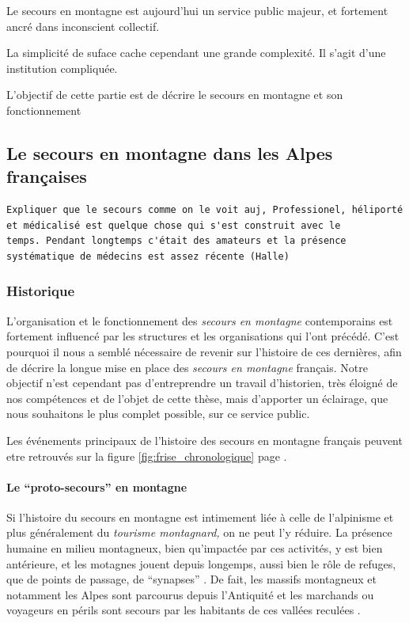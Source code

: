 Le secours en montagne est aujourd'hui un service public majeur, et
fortement ancré dans inconscient collectif.

La simplicité de suface cache cependant une grande complexité. Il
s'agit d'une institution compliquée.

L'objectif de cette partie est de décrire le secours en montagne et
son fonctionnement

\subsection{Le secours en montagne dans les Alpes françaises}
\label{subsec:1-1-1}


\begin{verbatim}
Expliquer que le secours comme on le voit auj, Professionel, héliporté
et médicalisé est quelque chose qui s'est construit avec le
temps. Pendant longtemps c'était des amateurs et la présence
systématique de médecins est assez récente (Halle)
\end{verbatim}

\subsubsection{Historique}
\label{subsubsec:1-1-1-1}

L'organisation et le fonctionnement des \emph{secours en montagne}
contemporains est fortement influencé par les structures et les
organisations qui l'ont précédé. C'est pourquoi il nous a semblé
nécessaire de revenir sur l'histoire de ces dernières, afin de décrire
la longue mise en place des \emph{secours en montagne} français. Notre
objectif n'est cependant pas d'entreprendre un travail d'historien,
très éloigné de nos compétences et de l'objet de cette thèse, mais
d'apporter un éclairage, que nous souhaitons le plus complet possible,
sur ce service public.

Les événements principaux de l'histoire des secours en montagne
français peuvent etre retrouvés sur la figure
\ref{fig:frise_chronologique} page \pageref{fig:frise_chronologique}.

\paragraph{Le \enquote{proto-secours} en montagne}
\label{par:1-1-1-1-1}

Si l'histoire du secours en montagne est intimement liée à celle de
l'alpinisme et plus généralement du \emph{tourisme montagnard,} on ne
peut l'y réduire. La présence humaine en milieu montagneux, bien
qu'impactée par ces activités, y est bien antérieure, et les motagnes
jouent depuis longemps, aussi bien le rôle de refuges, que de points
de passage, de \enquote{synapses} \autocite[p. 337]{Brunet1992}. De
fait, les massifs montagneux et notamment les Alpes sont parcourus
depuis l'Antiquité et les marchands ou voyageurs en périls sont
secours par les habitants de ces vallées reculées
\autocite{Mezin2016}.

